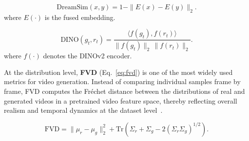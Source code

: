\begin{equation}
\label{eq:dreamsim}
\mathrm{DreamSim}(x,y) = 1 - \| E(x) - E(y) \|_2.
\end{equation}
where $E(\cdot)$ is the fused embedding.

\begin{equation}
\label{eq:dino}
\mathrm{DINO}(g_t, r_t) = \frac{\langle f(g_t), f(r_t) \rangle}{\|f(g_t)\|_2 \, \|f(r_t)\|_2}.
\end{equation}
where $f(\cdot)$ denotes the DINOv2 encoder.

At the distribution level, \textbf{FVD} (Eq.~\ref{eq:fvd}) is one of the most widely used metrics for video generation. Instead of comparing individual samples frame by frame, FVD computes the Fr\'echet distance between the distributions of real and generated videos in a pretrained video feature space, thereby reflecting overall realism and temporal dynamics at the dataset level~\citep{unterthiner2018fvd}. 

\begin{equation}
\label{eq:fvd}
\mathrm{FVD}
= \|\mu_r - \mu_g\|_2^2
+ \mathrm{Tr}\!\left(\Sigma_r + \Sigma_g 
- 2\left(\Sigma_r\Sigma_g\right)^{1/2}\right).
\end{equation}

